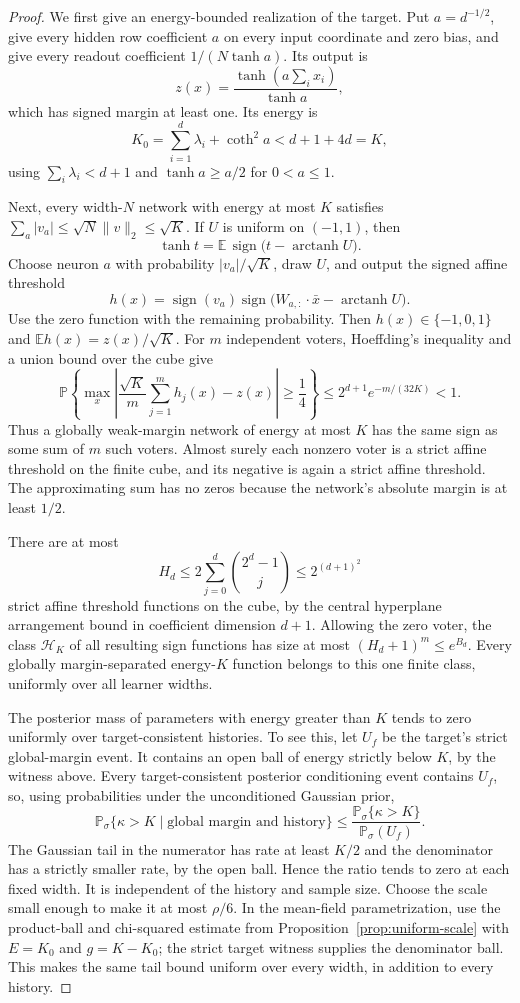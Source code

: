 \documentclass[11pt]{article}
\newcommand{\E}{\mathbb E}
\newcommand{\Pp}{\mathbb P}
\newcommand{\sgn}{\operatorname{sign}}
\begin{document}
\begin{proof}
We first give an energy-bounded realization of the target. Put
$a=d^{-1/2}$, give every hidden row coefficient $a$ on every input
coordinate and zero bias, and give every readout coefficient
$1/(N\tanh a)$. Its output is
\[
 z(x)=\frac{\tanh(a\sum_i x_i)}{\tanh a},
\]
which has signed margin at least one. Its energy is
\[
 K_0=\sum_{i=1}^d\lambda_i+\coth^2a<d+1+4d=K,
\]
using $\sum_i\lambda_i<d+1$ and $\tanh a\ge a/2$ for $0<a\le1$.

Next, every width-$N$ network with energy at most $K$ satisfies
$\sum_a|v_a|\le\sqrt N\|v\|_2\le\sqrt K$.
If $U$ is uniform on $(-1,1)$, then
\[
 \tanh t=\E\,\sgn\bigl(t-\operatorname{arctanh}U\bigr).
\]
Choose neuron $a$ with probability $|v_a|/\sqrt K$, draw $U$, and
output the signed affine threshold
\[
 h(x)=\sgn(v_a)\sgn\bigl(W_{a,:}\cdot\bar x-
                     \operatorname{arctanh}U\bigr).
\]
Use the zero function with the remaining probability. Then
$h(x)\in\{-1,0,1\}$ and $\E h(x)=z(x)/\sqrt K$.
For $m$ independent voters, Hoeffding's inequality and a union bound
over the cube give
\[
 \Pp\!\left\{\max_x\left|
       \frac{\sqrt K}{m}\sum_{j=1}^m h_j(x)-z(x)\right|\ge\frac14\right\}
 \le2^{d+1}e^{-m/(32K)}<1.
\]
Thus a globally weak-margin network of energy at most $K$ has the
same sign as some sum of $m$ such voters. Almost surely each nonzero
voter is a strict affine threshold on the finite cube, and its negative
is again a strict affine threshold. The approximating sum has no zeros
because the network's absolute margin is at least $1/2$.

There are at most
\[
 H_d\le2\sum_{j=0}^d\binom{2^d-1}j\le2^{(d+1)^2}
\]
strict affine threshold functions on the cube, by the central
hyperplane arrangement bound in coefficient dimension $d+1$.
Allowing the zero voter, the class $\mathcal H_K$ of all resulting
sign functions has size at most
$(H_d+1)^m\le e^{B_d}$. Every globally margin-separated
energy-$K$ function belongs to this one finite class, uniformly over
all learner widths.

The posterior mass of parameters with energy greater than $K$ tends
to zero uniformly over target-consistent histories. To see this, let
$U_f$ be the target's strict global-margin event. It contains an open
ball of energy strictly below $K$, by the witness above.
Every target-consistent posterior conditioning event contains $U_f$,
so, using probabilities under the unconditioned Gaussian prior,
\[
 \Pp_\sigma\{\kappa>K\mid\text{global margin and history}\}
 \le\frac{\Pp_\sigma\{\kappa>K\}}{\Pp_\sigma(U_f)}.
\]
The Gaussian tail in the numerator has rate at least $K/2$ and the
denominator has a strictly smaller rate, by the open ball. Hence the
ratio tends to zero at each fixed width. It is independent of the
history and sample size. Choose the scale small enough to make it
at most $\rho/6$. In the mean-field parametrization, use the
product-ball and chi-squared estimate from
Proposition~\ref{prop:uniform-scale} with $E=K_0$ and $g=K-K_0$;
the strict target witness supplies the denominator ball. This makes
the same tail bound uniform over every width, in addition to every
history.


\end{proof}
\end{document}
